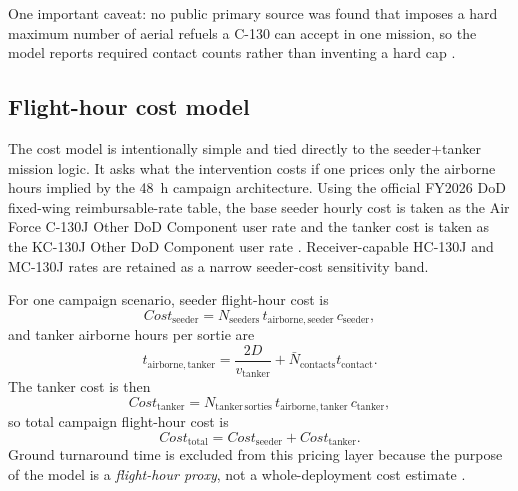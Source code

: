 \documentclass[8pt,twocolumn]{extarticle}
\begin{document}
\vspace{0.25em}
One important caveat: no public primary source was found that imposes a hard maximum number of aerial refuels a C-130 can accept in one mission, so the model reports required contact counts rather than inventing a hard cap \citep{AeolusSourceLog}.

\subsection*{Flight-hour cost model}

The cost model is intentionally simple and tied directly to the seeder+tanker mission logic. It asks what the intervention costs if one prices only the airborne hours implied by the \SI{48}{h} campaign architecture. Using the official FY2026 DoD fixed-wing reimbursable-rate table, the base seeder hourly cost is taken as the Air Force C-130J Other DoD Component user rate and the tanker cost is taken as the KC-130J Other DoD Component user rate \citep{DoDFY2026Rates,AeolusCostNote}. Receiver-capable HC-130J and MC-130J rates are retained as a narrow seeder-cost sensitivity band.

\vspace{0.25em}
For one campaign scenario, seeder flight-hour cost is
\begin{equation}
Cost_{\mathrm{seeder}} =
N_{\mathrm{seeders}} \,
t_{\mathrm{airborne,seeder}} \,
c_{\mathrm{seeder}} ,
\end{equation}
and tanker airborne hours per sortie are
\begin{equation}
t_{\mathrm{airborne,tanker}} =
\frac{2D}{v_{\mathrm{tanker}}}
+
\bar{N}_{\mathrm{contacts}} t_{\mathrm{contact}} .
\end{equation}
The tanker cost is then
\begin{equation}
Cost_{\mathrm{tanker}} =
N_{\mathrm{tanker\,sorties}} \,
t_{\mathrm{airborne,tanker}} \,
c_{\mathrm{tanker}} ,
\end{equation}
so total campaign flight-hour cost is
\begin{equation}
Cost_{\mathrm{total}} = Cost_{\mathrm{seeder}} + Cost_{\mathrm{tanker}} .
\end{equation}
Ground turnaround time is excluded from this pricing layer because the purpose of the model is a \emph{flight-hour proxy}, not a whole-deployment cost estimate \citep{AeolusCostNote}.
\end{document}
